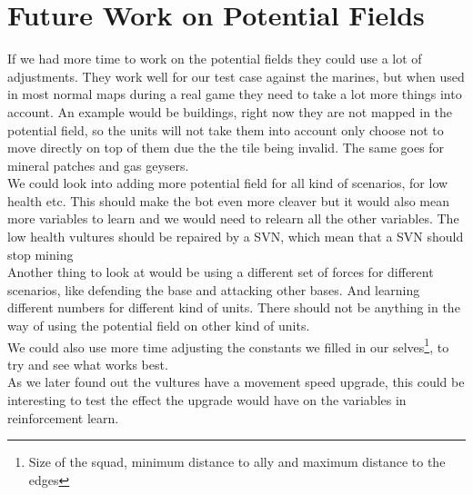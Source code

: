 \section{Future Work on Potential Fields}
	If we had more time to work on the potential fields they could use a lot of adjustments. They work well for our test case against the marines, but when used in most normal maps during a real game they need to take a lot more things into account. An example would be buildings, right now they are not mapped in the potential field, so the units will not take them into account only choose not to move directly on top of them due the the tile being invalid. The same goes for mineral patches and gas geysers. \\
	
	We could look into adding more potential field for all kind of scenarios, for low health etc. This should make the bot even more cleaver but it would also mean more variables to learn and we would need to relearn all the other variables. The low health vultures should be repaired by a SVN, which mean that
a SVN should stop mining\\
	
	Another thing to look at would be using a different set of forces for different scenarios, like defending the base and attacking other bases. And learning different numbers for different kind of units. There should not be anything in the way of using the potential field on other kind of units. \\
	
	We could also use more time adjusting the constants we filled in our selves\footnote{Size of the squad, minimum distance to ally and maximum distance to the edges}, to try and see what works best. \\

	As we later found out the vultures have a movement speed upgrade, this could be interesting to test the effect the upgrade would have on the
variables in reinforcement learn.	